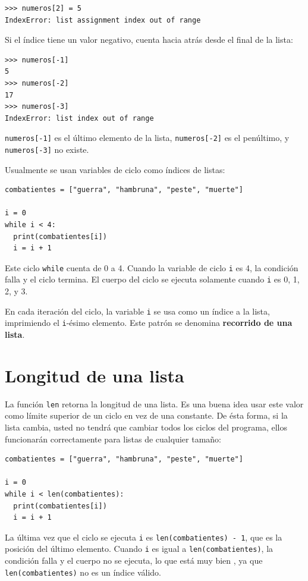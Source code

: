 \begin{lstlisting}
>>> numeros[2] = 5
IndexError: list assignment index out of range
\end{lstlisting}
Si el índice tiene un valor negativo, cuenta hacia atrás desde el
final de la lista:
\begin{lstlisting}
>>> numeros[-1]
5
>>> numeros[-2]
17
>>> numeros[-3]
IndexError: list index out of range
\end{lstlisting}
\texttt{numeros{[}-1{]}} es el último elemento de la lista, \texttt{numeros{[}-2{]}}
es el penúltimo, y \texttt{numeros{[}-3{]}} no existe.

Usualmente se usan variables de ciclo como índices de listas:
\begin{lstlisting}
combatientes = ["guerra", "hambruna", "peste", "muerte"]

i = 0
while i < 4:
  print(combatientes[i])
  i = i + 1
\end{lstlisting}
Este ciclo \texttt{while} cuenta de 0 a 4. Cuando la variable de ciclo
\texttt{i} es 4, la condición falla y el ciclo termina. El cuerpo
del ciclo se ejecuta solamente cuando \texttt{i} es 0, 1, 2, y 3.

En cada iteración del ciclo, la variable \texttt{i} se usa como un
índice a la lista, imprimiendo el \texttt{i}-ésimo elemento. Este
patrón se denomina \textbf{recorrido de una lista}.

 

\section{Longitud de una lista}

 

La función \texttt{len} retorna la longitud de una lista. Es una buena
idea usar este valor como límite superior de un ciclo en vez de una
constante. De ésta forma, si la lista cambia, usted no tendrá que
cambiar todos los ciclos del programa, ellos funcionarán correctamente
para listas de cualquier tamaño:
\begin{lstlisting}
combatientes = ["guerra", "hambruna", "peste", "muerte"]

i = 0
while i < len(combatientes):
  print(combatientes[i])
  i = i + 1
\end{lstlisting}
La última vez que el ciclo se ejecuta \texttt{i} es \texttt{len(combatientes)
- 1}, que es la posición del último elemento. Cuando \texttt{i} es
igual a \texttt{len(combatientes)}, la condición falla y el cuerpo
no se ejecuta, lo que está muy bien , ya que \texttt{len(combatientes)}
no es un índice válido.

